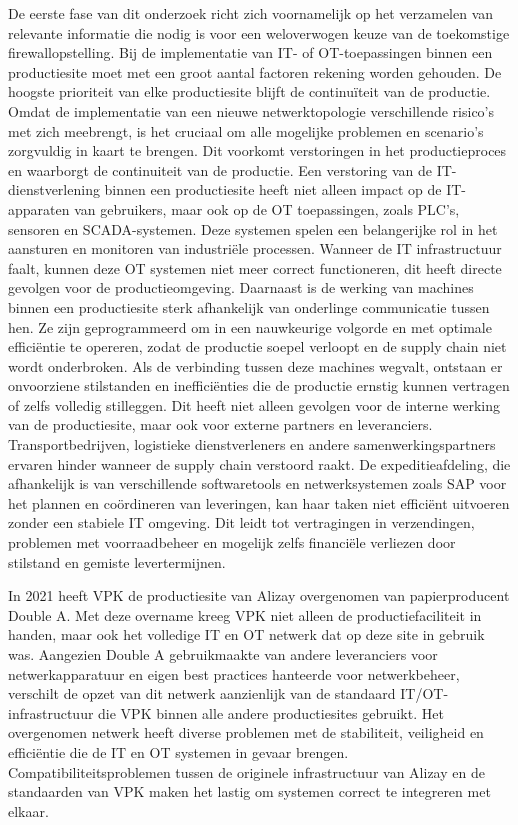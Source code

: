 De eerste fase van dit onderzoek richt zich voornamelijk op het verzamelen van relevante informatie die nodig is voor een weloverwogen keuze van de toekomstige firewallopstelling. Bij de implementatie van IT- of OT-toepassingen binnen een productiesite moet met een groot aantal factoren rekening worden gehouden. De hoogste prioriteit van elke productiesite blijft de continuïteit van de productie. Omdat de implementatie van een nieuwe netwerktopologie verschillende risico’s met zich meebrengt, is het cruciaal om alle mogelijke problemen en scenario’s zorgvuldig in kaart te brengen. Dit voorkomt verstoringen in het productieproces en waarborgt de continuiteit van de productie.
Een verstoring van de IT-dienstverlening binnen een productiesite heeft niet alleen impact op de IT-apparaten van gebruikers, maar ook op de OT toepassingen, zoals PLC’s, sensoren en SCADA-systemen. Deze systemen spelen een belangerijke rol in het aansturen en monitoren van industriële processen. Wanneer de IT infrastructuur faalt, kunnen deze OT systemen niet meer correct functioneren, dit heeft directe gevolgen voor de productieomgeving. Daarnaast is de werking van machines binnen een productiesite sterk afhankelijk van onderlinge communicatie tussen hen. Ze zijn geprogrammeerd om in een nauwkeurige volgorde en met optimale efficiëntie te opereren, zodat de productie soepel verloopt en de supply chain niet wordt onderbroken. Als de verbinding tussen deze machines wegvalt, ontstaan er onvoorziene stilstanden en inefficiënties die de productie ernstig kunnen vertragen of zelfs volledig stilleggen. Dit heeft niet alleen gevolgen voor de interne werking van de productiesite, maar ook voor externe partners en leveranciers. Transportbedrijven, logistieke dienstverleners en andere samenwerkingspartners ervaren hinder wanneer de supply chain verstoord raakt. De expeditieafdeling, die afhankelijk is van verschillende softwaretools en netwerksystemen zoals SAP voor het plannen en coördineren van leveringen, kan haar taken niet efficiënt uitvoeren zonder een stabiele IT omgeving. Dit leidt tot vertragingen in verzendingen, problemen met voorraadbeheer en mogelijk zelfs financiële verliezen door stilstand en gemiste levertermijnen.

In 2021 heeft VPK de productiesite van Alizay overgenomen van papierproducent Double A. Met deze overname kreeg VPK niet alleen de productiefaciliteit in handen, maar ook het volledige IT en OT netwerk dat op deze site in gebruik was. Aangezien Double A gebruikmaakte van andere leveranciers voor netwerkapparatuur en eigen best practices hanteerde voor netwerkbeheer, verschilt de opzet van dit netwerk aanzienlijk van de standaard IT/OT-infrastructuur die VPK binnen alle andere productiesites gebruikt.
Het overgenomen netwerk heeft diverse problemen met de stabiliteit, veiligheid en efficiëntie die de IT en OT systemen in gevaar brengen. Compatibiliteitsproblemen tussen de originele infrastructuur van Alizay en de standaarden van VPK maken het lastig om systemen correct te integreren met elkaar.

